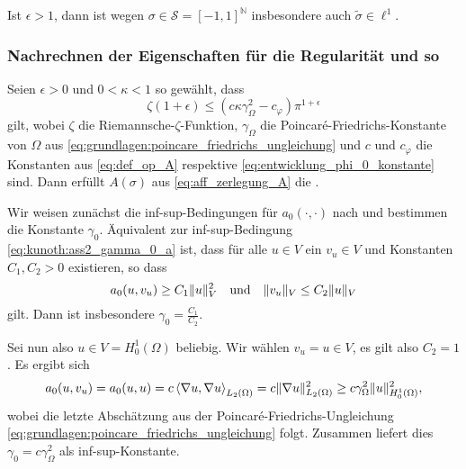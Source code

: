 Ist $\epsilon > 1$, dann ist wegen $\sigma \in \mathcal S = [-1, 1]^{\mathbb{N}}$ insbesondere auch $\tilde \sigma \in \ell^{1}$.


\subsubsection{Nachrechnen der Eigenschaften für die Regularität und so} %
\label{ssub:nachrechnen_von_thref_thm_kunoth_assumption2}

\begin{Satz}
    \label{satz:regularitaet_nachrechnen}
    Seien $\epsilon > 0$ und $0 < \kappa < 1$ so gewählt, dass
    \begin{equation}
        \zeta(1 + \epsilon) \leq (c \kappa \gamma_{\Omega}^{2} - c_{\varphi}) \pi^{1+\epsilon}
    \end{equation}
    gilt,
    wobei $\zeta$ die Riemannsche-$\zeta$-Funktion, $\gamma_{\Omega}$ die Poincaré-Friedrichs-Konstante von $\Omega$ aus \eqref{eq:grundlagen:poincare_friedrichs_ungleichung} und $c$ und $c_{\varphi}$ die Konstanten aus \eqref{eq:def_op_A} respektive \eqref{eq:entwicklung_phi_0_konstante} sind.
    Dann erfüllt $A(\sigma)$ aus \eqref{eq:aff_zerlegung_A} die .

    \begin{Beweis}
        Wir weisen zunächst die inf-sup-Bedingungen für $a_{0}(\cdot, \cdot)$ nach und bestimmen die Konstante $\gamma_{0}$.
        Äquivalent zur inf-sup-Bedingung \eqref{eq:kunoth:ass2_gamma_0_a} ist, dass für alle $u \in V$ ein $v_{u} \in V$ und Konstanten $C_{1}, C_{2} > 0$ existieren, so dass
        \begin{equation}
            a_{0}(u, v_{u}) \geq C_{1} \lVert u\rVert_{V}^{2} \quad \text{und} \quad \lVert v_{u}\rVert_{V} \leq C_{2} \lVert u\rVert_{V}
        \end{equation}
        gilt.
        Dann ist insbesondere $\gamma_{0} = \frac{C_{1}}{C_{2}}$.

        Sei nun also $u \in V = H^{1}_{0}(\Omega)$ beliebig.
        Wir wählen $v_{u} = u \in V$, es gilt also $C_{2} = 1$.
        Es ergibt sich
        \begin{align}
            a_{0}(u, v_{u}) = a_{0}(u, u) = c \left\langle\nabla u,\nabla u\right\rangle_{L_{2}(\Omega)} = c \lVert\nabla u\rVert_{L_{2}(\Omega)}^{2} \geq c \gamma_{\Omega}^{2} \lVert u\rVert_{H^{1}_{0}(\Omega)}^{2},
        \end{align}
        wobei die letzte Abschätzung aus der Poincaré-Friedrichs-Ungleichung \eqref{eq:grundlagen:poincare_friedrichs_ungleichung} folgt.
        Zusammen liefert dies $\gamma_{0} = c \gamma_{\Omega}^{2}$ als inf-sup-Konstante.


\end{Beweis}
\end{Satz}
